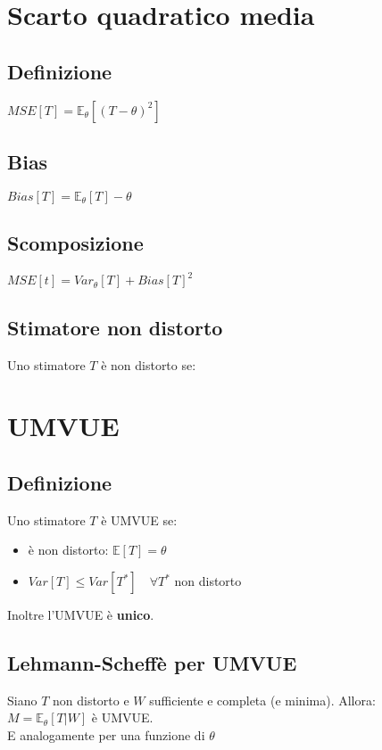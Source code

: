 \documentclass[a4paper,notitlepage]{report}%
\newcommand{\E}{\mathbb{E}} %
\begin{document}
\begin{multicols*}{2}
\section*{Scarto quadratico media}


    \subsection*{Definizione}
    $MSE[T] = \E_\theta[(T-\theta)^2]$


    \subsection*{Bias}
    $Bias[T] = \E_\theta[T]-\theta$

    
    \subsection*{Scomposizione}
    $MSE[t] = Var_\theta[T] + Bias[T]^2$


    \subsection*{Stimatore non distorto}
    Uno stimatore $T$ è non distorto se:


\section*{UMVUE}

    \subsection*{Definizione}
    Uno stimatore $T$ è UMVUE se:
    \begin{itemize}
        \item è non distorto: $\E[T]=\theta$
        \item $Var[T] \leq Var[T^*] \quad \forall T^*$ non distorto
    \end{itemize}
    Inoltre l'UMVUE è \textbf{unico}.

    \subsection*{Lehmann-Scheffè per UMVUE}
    Siano $T$ non distorto e $W$ sufficiente e completa (e minima).
    Allora: \\
    $M=\E_\theta[T|W]$ è UMVUE.\\
    E analogamente per una funzione di $\theta$



\end{multicols*}
\end{document}
